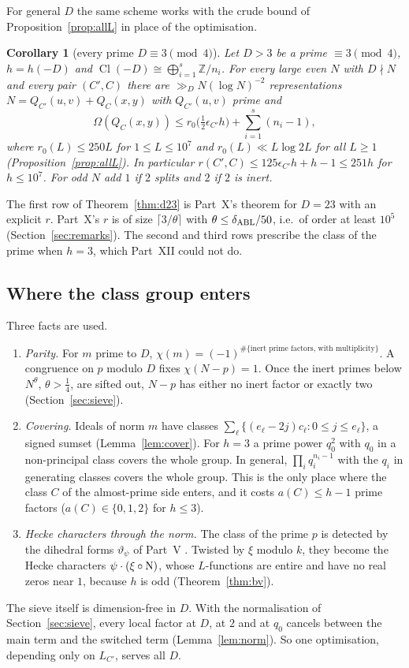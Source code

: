 \documentclass[11pt]{amsart}
\newtheorem{corollary}[theorem]{Corollary}
\theoremstyle{remark}
\newcommand{\Z}{\mathbb Z}
\DeclareMathOperator{\Cl}{Cl}
\begin{document}
For general $D$ the same scheme works with the crude bound of Proposition~\ref{prop:allL} in place of the optimisation.

\begin{corollary}[every prime $D\equiv3\pmod4$]\label{cor:allD}
Let $D>3$ be a prime $\equiv3\pmod4$, $h=h(-D)$ and $\Cl(-D)\cong\bigoplus_{i=1}^s\Z/n_i$. For every large even $N$ with $D\nmid N$ and every pair $(C',C)$ there are $\gg_DN(\log N)^{-2}$ representations $N=Q_{C'}(u,v)+Q_C(x,y)$ with $Q_{C'}(u,v)$ prime and
\[
\Omega(Q_C(x,y))\le r_0\bigl(\tfrac12\epsilon_{C'}h\bigr)+\sum_{i=1}^s(n_i-1),
\]
where $r_0(L)\le250L$ for $1\le L\le10^7$ and $r_0(L)\ll L\log 2L$ for all $L\ge1$ (Proposition~\ref{prop:allL}). In particular $r(C',C)\le125\epsilon_{C'}h+h-1\le251h$ for $h\le10^7$. For odd $N$ add $1$ if $2$ splits and $2$ if $2$ is inert.
\end{corollary}

The first row of Theorem~\ref{thm:d23} is Part~X's theorem for $D=23$ with an explicit $r$. Part~X's $r$ is of size $\lceil3/\theta\rceil$ with $\theta\le\delta_{\rm ABL}/50$, i.e.\ of order at least $10^5$ (Section~\ref{sec:remarks}). The second and third rows prescribe the class of the prime when $h=3$, which Part~XII could not do.

\subsection*{Where the class group enters}
Three facts are used.
\begin{enumerate}[leftmargin=2em]
\item \emph{Parity.} For $m$ prime to $D$, $\chi(m)=(-1)^{\#\{\text{inert prime factors, with multiplicity}\}}$. A congruence on $p$ modulo $D$ fixes $\chi(N-p)=1$. Once the inert primes below $N^\theta$, $\theta>\frac14$, are sifted out, $N-p$ has either no inert factor or exactly two (Section~\ref{sec:sieve}).
\item \emph{Covering.} Ideals of norm $m$ have classes $\sum_\ell\{(e_\ell-2j)c_\ell:0\le j\le e_\ell\}$, a signed sumset (Lemma~\ref{lem:cover}). For $h=3$ a prime power $q_0^2$ with $q_0$ in a non-principal class covers the whole group. In general, $\prod_iq_i^{n_i-1}$ with the $q_i$ in generating classes covers the whole group. This is the only place where the class $C$ of the almost-prime side enters, and it costs $a(C)\le h-1$ prime factors ($a(C)\in\{0,1,2\}$ for $h\le3$).
\item \emph{Hecke characters through the norm.} The class of the prime $p$ is detected by the dihedral forms $\vartheta_\psi$ of Part~V \cite{ChenV}. Twisted by $\xi$ modulo $k$, they become the Hecke characters $\psi\cdot(\xi\circ{\rm N})$, whose $L$-functions are entire and have no real zeros near $1$, because $h$ is odd (Theorem~\ref{thm:bv}).
\end{enumerate}
The sieve itself is dimension-free in $D$. With the normalisation of Section~\ref{sec:sieve}, every local factor at $D$, at $2$ and at $q_0$ cancels between the main term and the switched term (Lemma~\ref{lem:norm}). So one optimisation, depending only on $L_{C'}$, serves all $D$.
\end{document}

